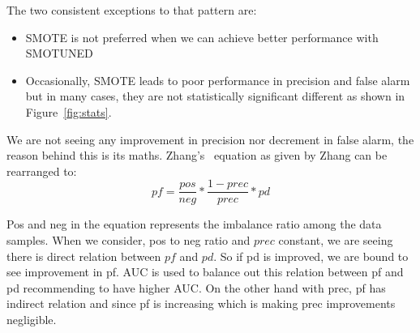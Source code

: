 \documentclass[10pt,conference]{IEEEtran}
\newcommand{\bi}{\begin{itemize}[leftmargin=0.4cm]}
\newcommand{\ei}{\end{itemize}}
\theoremstyle{break}
\theoremstyle{break}
\begin{document}
The two consistent exceptions to that pattern are:
\bi
\item 
SMOTE is not preferred when we can achieve better performance with SMOTUNED
\item 
Occasionally, SMOTE leads to poor performance in precision and false alarm but in many cases, they are not statistically significant different as shown in Figure~\ref{fig:stats}.  
\ei

We are not seeing any improvement in precision nor decrement in false alarm, the reason behind this is its maths. Zhang's~\cite{menzies2007problems} equation as given by Zhang can be rearranged to:
\[
  \mathit{pf}=  \frac{pos}{neg} *\frac{1-\mathit{prec}}{\mathit{prec}}* \mathit{pd}\]

Pos and neg in the equation represents the imbalance ratio among the data samples. When we consider, pos to neg ratio and $prec$ constant, we are seeing there is direct relation between $pf$ and $pd$. So if pd is improved, we are bound to see improvement in pf. AUC is used to balance out this relation between pf and pd recommending to have higher AUC. On the other hand with prec, pf has indirect relation and since pf is increasing which is making prec improvements negligible.



\end{document}
